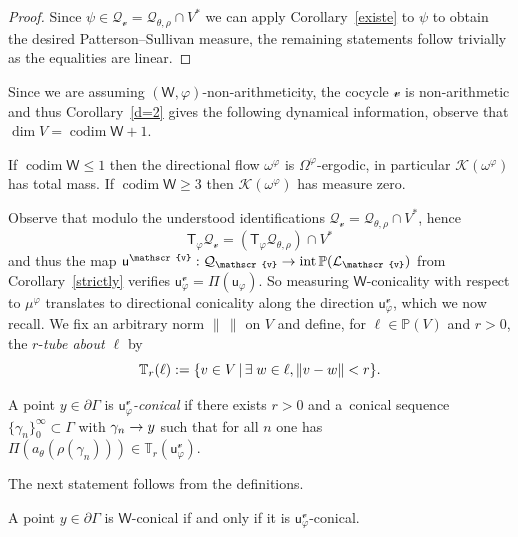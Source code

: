 \documentclass[AHL,Unicode,longabstracts,MathTools]{cedram}
\makeatletter
\DeclareMathOperator{\inte}{int}
\DeclareMathOperator{\codim}{codim}
\newcommand{\cartan}{a}
\newcommand{\scr}{\mathscr}
\newcommand{\cc}{\scr{v}}
\renewcommand{\sf}[1]{{\mathsf{#1}}}
\newcommand{\G}{\sf{\Gamma}}
\newcommand{\cal}{\mathcal}
\newcommand{\calQ}{\mathcal{Q}}
\renewcommand{\P}{\mathbb{P}}
\newcommand{\T}{\mathbb{T}}
\newcommand{\g}{\gamma}
\renewcommand{\t}{\theta}
\newcommand{\bord}{\partial}
\newcommand{\rfr}{\beta}
\newcommand{\BM}{\Omega}
\newcommand{\df}{\omega}
\newcommand{\ov}{\overline}
\newcommand{\ovcc}{\bar{\cc}}
\renewcommand{\/}{\backslash}
\newcommand{\<}{\langle}
\renewcommand{\>}{\rangle}
\let\save@mathaccent\mathaccent
\newcommand*\if@single[3]{%
  \setbox0\hbox{${\mathaccent"0362{#1}}^H$}%
  \setbox2\hbox{${\mathaccent"0362{\kern0pt#1}}^H$}%
  \ifdim\ht0=\ht2 #3\else #2\fi
  }
\newcommand*\rel@kern[1]{\kern#1\dimexpr\macc@kerna}
\newcommand*\widebar[1]{\@ifnextchar^{{\wide@bar{#1}{0}}}{\wide@bar{#1}{1}}}
\newcommand*\wide@bar[2]{\if@single{#1}{\wide@bar@{#1}{#2}{1}}{\wide@bar@{#1}{#2}{2}}}
\newcommand*\wide@bar@[3]{%
  \begingroup
  \def\mathaccent##1##2{%
    \let\mathaccent\save@mathaccent
    \if#32 \let\macc@nucleus\first@char \fi
    \setbox\z@\hbox{$\macc@style{\macc@nucleus}_{}$}%
    \setbox\tw@\hbox{$\macc@style{\macc@nucleus}{}_{}$}%
    \dimen@\wd\tw@
    \advance\dimen@-\wd\z@
    \divide\dimen@ 3
    \@tempdima\wd\tw@
    \advance\@tempdima-\scriptspace
    \divide\@tempdima 10
    \advance\dimen@-\@tempdima
    \ifdim\dimen@>\z@ \dimen@0pt\fi
    \rel@kern{0.6}\kern-\dimen@
    \if#31
      \overline{\rel@kern{-0.6}\kern\dimen@\macc@nucleus\rel@kern{0.4}\kern\dimen@}%
      \advance\dimen@0.4\dimexpr\macc@kerna
      \let\final@kern#2%
      \ifdim\dimen@<\z@ \let\final@kern1\fi
      \if\final@kern1 \kern-\dimen@\fi
    \else
      \overline{\rel@kern{-0.6}\kern\dimen@#1}%
    \fi
  }%
  \macc@depth\@ne
  \let\math@bgroup\@empty \let\math@egroup\macc@set@skewchar
  \mathsurround\z@ \frozen@everymath{\mathgroup\macc@group\relax}%
  \macc@set@skewchar\relax
  \let\mathaccentV\macc@nested@a
  \if#31
    \macc@nested@a\relax111{#1}%
  \else
    \def\gobble@till@marker##1\endmarker{}%
    \futurelet\first@char\gobble@till@marker#1\endmarker
    \ifcat\noexpand\first@char A\else
      \def\first@char{}%
    \fi
    \macc@nested@a\relax111{\first@char}%
  \fi
  \endgroup
}
\let\oldbar\bar
\renewcommand*{\bar}[1]{{\mathchoice{\widebar{#1}}{\widebar{#1}}{\widebar{#1}}{\oldbar{#1}}}}
\renewcommand*{\to}{\mathchoice{\longrightarrow}{\rightarrow}{\rightarrow}{\rightarrow}}
\let\originalleft\left
\let\originalright\right
\renewcommand{\left}{\mathopen{}\mathclose\bgroup\originalleft}
\renewcommand{\right}{\aftergroup\egroup\originalright}
\let\oldexists\exists
\renewcommand*{\exists}{\mathrel{\oldexists}}
\makeatother
\begin{document}

\begin{proof}
Since $\psi\in\calQ_\cc=\calQ_{\t,\rho}\cap V^*$ we can apply Corollary~\ref{existe} to $\psi$ to obtain the desired Patterson--Sullivan measure, the remaining statements follow trivially as the equalities are linear.
\end{proof}

Since we are assuming $(\sf W,\varphi)$-non-arithmeticity, the cocycle $\cc$ is non-arithmetic and thus Corollary~\ref{d=2} gives the following dynamical information, observe that $\dim V=\codim \sf W+1$.

\begin{coro}\label{dicoCC}
If $\codim \sf W\leq1$ then the directional flow $\df^\varphi$ is $\BM^\varphi$-ergodic, in particular $\cal K(\df^\varphi)$ has total mass. If $\codim \sf W\geq3$ then $\cal K(\df^\varphi)$ has measure zero.
\end{coro}

Observe that modulo the understood identifications $\calQ_\cc=\calQ_{\t,\rho}\cap V^*$, hence
\[
\sf T_\varphi\calQ_\cc=(\sf T_\varphi\calQ_{\t,\rho})\cap V^*
\]
and thus the map $\sf u^\cc:\calQ_\cc\to\inte\P(\cal L_\cc)$ from Corollary~\ref{strictly} verifies $\sf u^\cc_\varphi=\Pi(\sf u_\varphi)$. So measuring $\sf W$-conicality with respect to $\mu^\varphi$ translates to directional conicality along the direction $\sf u^\cc_\varphi$, which we now recall. We fix an arbitrary norm $\|\,\|$ on $V$ and define, for $\ell\in\P(V)$ and $r>0$, the $r$-\emph{tube about $\ell$} by
\[
\T_r(\ell):=\left\{v\in V\,\middle|\, \exists w\in\ell, \|v-w\|<r\right\}.
\]

\begin{defi}\label{defCon}
A point $y\in\bord\G$ is \emph{$\sf u_\varphi^\cc$-conical} if there exists $r>0$ and a~conical sequence $\{\g_n\}_0^\infty\subset\G$ with $\g_n\to y$ such that for all $n$ one has $\Pi(\cartan_\theta(\rho(\g_n)))\in\T_r(\sf u_\varphi^\cc)$.
\end{defi}

The next statement follows from the definitions.

\begin{lemm}
A point $y\in\bord\G$ is $\sf W$-conical if and only if it is $\sf u^\cc_\varphi$-conical.
\end{lemm}
\end{document}
